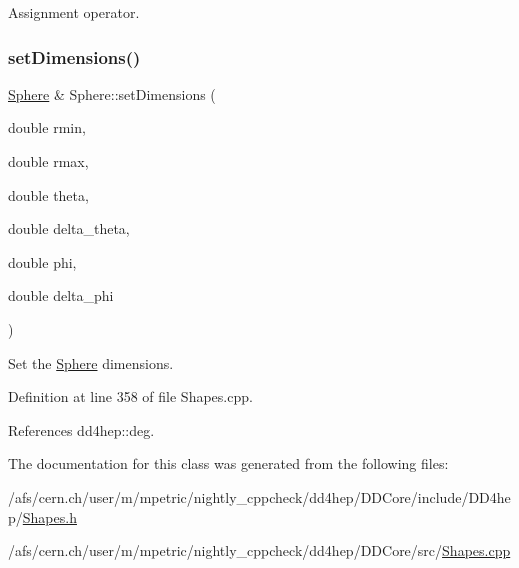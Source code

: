 Assignment operator. 

\hypertarget{class_d_d4hep_1_1_geometry_1_1_sphere_a0c80e5f5655ed0211c769d9193461d79}{}\label{class_d_d4hep_1_1_geometry_1_1_sphere_a0c80e5f5655ed0211c769d9193461d79} 
\subsubsection{\texorpdfstring{set\+Dimensions()}{setDimensions()}}
{\footnotesize\ttfamily \hyperlink{class_d_d4hep_1_1_geometry_1_1_sphere}{Sphere} \& Sphere\+::set\+Dimensions (\begin{DoxyParamCaption}\item[{double}]{rmin,  }\item[{double}]{rmax,  }\item[{double}]{theta,  }\item[{double}]{delta\+\_\+theta,  }\item[{double}]{phi,  }\item[{double}]{delta\+\_\+phi }\end{DoxyParamCaption})}



Set the \hyperlink{class_d_d4hep_1_1_geometry_1_1_sphere}{Sphere} dimensions. 



Definition at line 358 of file Shapes.\+cpp.



References dd4hep\+::deg.



The documentation for this class was generated from the following files\+:\begin{DoxyCompactItemize}
\item 
/afs/cern.\+ch/user/m/mpetric/nightly\+\_\+cppcheck/dd4hep/\+D\+D\+Core/include/\+D\+D4hep/\hyperlink{_shapes_8h}{Shapes.\+h}\item 
/afs/cern.\+ch/user/m/mpetric/nightly\+\_\+cppcheck/dd4hep/\+D\+D\+Core/src/\hyperlink{_shapes_8cpp}{Shapes.\+cpp}\end{DoxyCompactItemize}
